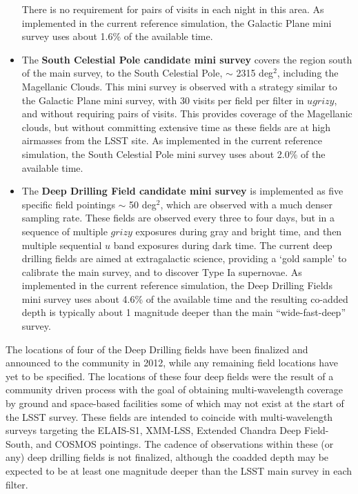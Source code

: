 \documentclass[DM,lsstdraft,toc,usenatbib]{lsstdoc}
\begin{document}
\begin{itemize}
There is no requirement for pairs of visits in each night in this area. As implemented in the current reference simulation, the Galactic Plane mini survey uses
about 1.6\% of the available time.
\item The {\bf South Celestial Pole candidate mini survey} covers the region south of the main survey, to the South Celestial Pole, $\sim$ 2315 deg$^2$,
including the Magellanic Clouds. 
This mini survey is observed with a strategy similar to the Galactic Plane mini survey, with 30 visits per field per filter in $ugrizy$, 
and without requiring pairs of visits. This provides coverage of the Magellanic clouds, but without committing extensive time as these fields are
at high airmasses from the LSST site. As implemented in the current reference simulation, the South Celestial Pole mini survey uses
about 2.0\% of the available time.
\item The {\bf Deep Drilling Field candidate mini survey} is implemented as five specific field pointings $\sim$ 50 deg$^2$, 
which are observed with a much denser sampling rate. These fields
are observed every three to four days, but in a sequence of multiple $grizy$ exposures during gray and bright time, and then
multiple sequential $u$ band exposures during dark time. The current deep drilling fields are aimed at extragalactic
science, providing a `gold sample' to calibrate the main survey, and to discover Type Ia supernovae. 
As implemented in the current reference simulation, the Deep Drilling Fields mini survey uses about 4.6\% of the available time
and the resulting co-added depth is typically about 1 magnitude deeper than the main ``wide-fast-deep'' survey. 
\end{itemize}

The locations of four of the Deep Drilling fields have been finalized and announced to the community
in 2012, while any remaining field locations 
have yet to be specified. The locations of these four deep fields were the result of a community driven process 
with the goal of obtaining multi-wavelength
coverage by ground and space-based facilities some of which may not exist at the start of the LSST survey.
These fields are intended to coincide with multi-wavelength surveys targeting the ELAIS-S1, XMM-LSS, Extended Chandra Deep Field-South, 
and COSMOS pointings. The cadence of observations within these (or any) deep drilling fields is not finalized, although the coadded
depth may be expected to be at least one magnitude deeper than the LSST main survey in each filter.
\end{document}
